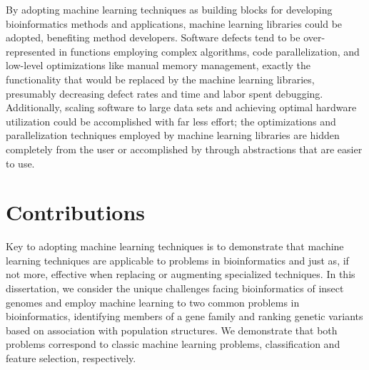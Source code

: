 By adopting machine learning techniques as building blocks for developing bioinformatics methods and applications, machine learning libraries could be adopted, benefiting method developers. Software defects tend to be over-represented in functions employing complex algorithms, code parallelization, and low-level optimizations like manual memory management, exactly the functionality that would be replaced by the machine learning libraries, presumably decreasing defect rates and time and labor spent debugging. Additionally, scaling software to large data sets and achieving optimal hardware utilization could be accomplished with far less effort; the optimizations and parallelization techniques employed by machine learning libraries are hidden completely from the user or accomplished by through abstractions that are easier to use.

\section{Contributions}
Key to adopting machine learning techniques is to demonstrate that machine learning techniques are applicable to problems in bioinformatics and just as, if not more, effective when replacing or augmenting specialized techniques.  In this dissertation, we consider the unique challenges facing bioinformatics of insect genomes and employ machine learning to two common problems in bioinformatics, identifying members of a gene family and ranking genetic variants based on association with population structures.  We demonstrate that both problems correspond to classic machine learning problems, classification and feature selection, respectively.


